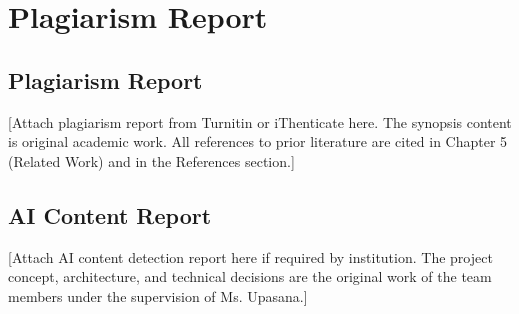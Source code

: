 \chapter{Plagiarism Report}
\section{Plagiarism Report}
[Attach plagiarism report from Turnitin or iThenticate here. The synopsis content is original academic work. All references to prior literature are cited in Chapter 5 (Related Work) and in the References section.]

\section{AI Content Report}
[Attach AI content detection report here if required by institution. The project concept, architecture, and technical decisions are the original work of the team members under the supervision of Ms. Upasana.]

